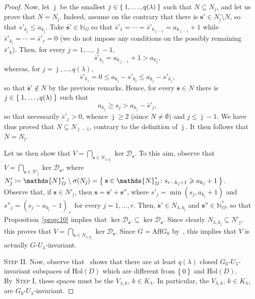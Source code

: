 \documentclass[10.5pt,reqno]{amsart}
\newcommand{\Aff}{\mathrm{Aff}}
\newcommand{\Hol}{\mathrm{Hol}}
\newcommand{\vect}[1]{\mathbf{{#1}}}
\newcommand{\N}{\mathds{N}}
\newcommand{\Dc}{\mathcal{D}}
\newcommand{\meg}{\leqslant}
\newcommand{\Meg}{\geqslant}
\begin{document}
\begin{proof}
	Now, let $\bar \jmath$ be the smallest $j\in\Set{1,\dots,q(\lambda)}$ such that $N\subseteq N_j$, and let us prove that $N=N_{\bar \jmath}$. Indeed, assume on the contrary that there is $\vect s'\in N_{\bar \jmath}\setminus N$, so that $s'_{k_{\bar\jmath}}\meg a_{k_{\bar \jmath}}$. 
	Take $\vect {\bar s'} \in \N_\Omega$ so that $\bar s'_1=\cdots= \bar s'_{k_{\bar \jmath-1}}=a_{k_{\bar\jmath-1}}+1$ while $\bar s'_{k_{\bar\jmath}}=\cdots=\bar s'_{r}=0$ (we do not impose any conditions on the possibly remaining $\bar s'_k$). Then, for every $j=1,\dots, \bar\jmath-1$,
	\[
	\bar s'_{k_j}=a_{k_{\bar\jmath-1}}+1>a_{k_j},
	\]
	whereas, for $j=\bar\jmath ,\dots, q(\lambda)$,
	\[
	\bar s'_{k_j}= 0\meg a_{k_{\bar\jmath}} -s'_{k_{\bar\jmath}} \meg a_{k_j}-s'_{k_j},
	\]
	so that $\vect {\bar s'}\not \in N$ by the previous remarks. Hence, for every $\vect s\in N$ there is $j\in \Set{1,\dots,q(\lambda)}$ such that
	\[
	a_{k_j}\Meg s_j> a_{k_j}-\bar s'_j,
	\]
	so that necessarily $\bar s'_j>0$, whence $\bar \jmath\Meg 2$ (since $N\neq \emptyset$) and $j\meg \bar \jmath-1$. We have thus proved that $N\subseteq N_{\bar\jmath-1}$, contrary to the definition of $\bar\jmath$. It then follows that $N=N_{\bar\jmath}$.
	
	Let us then show that $V=\bigcap_{\vect s\in N_{\lambda,k_{\bar \jmath}}}\ker \Dc_{\vect s}$. 
	To this aim, observe that $V= \bigcap_{\vect s\in N'_{\bar \jmath}} \ker \Dc_{\vect s}$, where $N'_{\bar \jmath}\coloneqq \N_{\Omega}^*\setminus \sigma(N_{\bar \jmath})=\Set{\vect s\in \N_{\Omega}^*\colon s_{r-k_{\bar \jmath}+1}\Meg a_{k_{\bar \jmath}}+1}$. 
	Observe that, if $\vect s\in N'_{\bar \jmath}$, then $\vect s=\vect s'+\vect s''$, where $s'_j=\min(s_j, a_{k_{\bar \jmath}}+1)$ and $s''_j=(s_j- a_{k_{\bar \jmath}}-1)_+$ for every $j=1,\dots,r$. Then, $\vect s'\in N_{\lambda,k_{\bar \jmath}}$ and $\vect s''\in \N_\Omega^*$, so that Proposition~\ref{prop:10} implies that  $\ker \Dc_{\vect s'} \subseteq \ker \Dc_{\vect s}$. Since clearly $N_{\lambda,k_{\bar \jmath}}\subseteq N'_{\bar \jmath} $, this proves that $V=\bigcap_{\vect s\in N_{\lambda,k_{\bar \jmath}}}\ker \Dc_{\vect s}$. Since $G=\Aff G_0$ by~\cite[Remark 1]{Nakajima}, this implies that $V$ is actually $G$-$U_\lambda$-invariant.
	
	\textsc{Step II.} Now, observe that~\cite[Theorem 5.3]{FarautKoranyi2} shows that there  are at least $q(\lambda)$  closed $G_0$-$U_\lambda$-invariant subspaces of $\Hol(D)$ which  are different from $\Set{0}$ and $\Hol(D)$.  By~\textsc{Step I}, these spaces must be the $V_{\lambda,k}$, $k\in K_\lambda$. In particular, the $V_{\lambda,k}$, $k\in K_\lambda$, are $G_0$-$U_\lambda$-invariant.
	

\end{proof}
\end{document}
